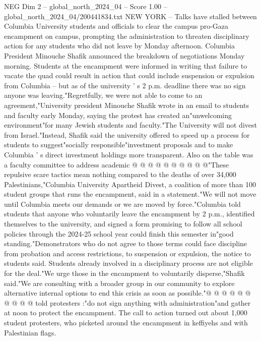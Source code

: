 \begin{textsample}{NEG Dim 2 – global\_north\_2024\_04 – Score 1.00 – global\_north\_2024\_04/200441834.txt}  \label{ex:f2_neg_180}
NEW YORK -- Talks have stalled between Columbia University students and officials to clear the campus pro-Gaza encampment on campus, prompting the administration to threaten disciplinary action for any students who did not leave by Monday afternoon.
Columbia President Minouche Shafik announced the breakdown of negotiations Monday morning.
Students at the encampment were informed in writing that failure to vacate the quad could result in action that could include suspension or expulsion from Columbia -- but as of the university ' s 2 p.m. deadline there was no sign anyone was leaving."Regretfully, we were not able to come to an agreement,"University president Minouche Shafik wrote in an email to students and faculty early Monday, saying the protest has created an"unwelcoming environment"for many Jewish students and faculty."The University will not divest from Israel."Instead, Shafik said the university offered to speed up a process for students to suggest"socially responsible"investment proposals and to make Columbia ' s direct investment holdings more transparent.
Also on the table was a faculty committee to address academic @ @ @ @ @ @ @ @ @ @"These repulsive scare tactics mean nothing compared to the deaths of over 34,000 Palestinians,"Columbia University Apartheid Divest, a coalition of more than 100 student groups that runs the encampment, said in a statement."We will not move until Columbia meets our demands or we are moved by force."Columbia told students that anyone who voluntarily leave the encampment by 2 p.m., identified themselves to the university, and signed a form promising to follow all school policies through the 2024-25 school year could finish this semester in"good standing."Demonstrators who do not agree to those terms could face discipline from probation and access restrictions, to suspension or expulsion, the notice to students said.
Students already involved in a disciplinary process are not eligible for the deal."We urge those in the encampment to voluntarily disperse,"Shafik said."We are consulting with a broader group in our community to explore alternative internal options to end this crisis as soon as possible."@ @ @ @ @ @ @ @ @ @ told protesters :"do not sign anything with administration"and gather at noon to protect the encampment.
The call to action turned out about 1,000 student protesters, who picketed around the encampment in keffiyehs and with Palestinian flags.

\end{textsample}
